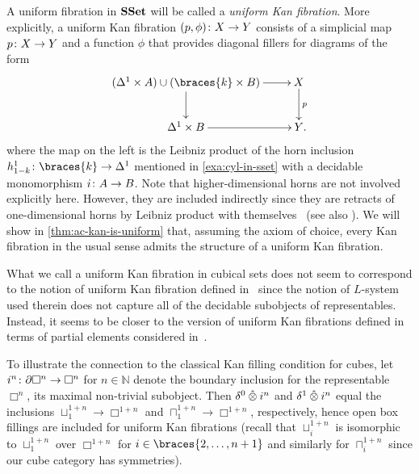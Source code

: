 \documentclass[reqno,10pt,a4paper,oneside,draft]{amsart}
\begin{document}
\begin{example}
A uniform fibration in $\mathbf{SSet}$ will be called a \emph{uniform Kan fibration}.
More explicitly, a uniform Kan fibration $(p, \phi) \colon X \to Y$ consists of a simplicial map $p \colon X \to Y$ and a function $\phi$ that provides diagonal fillers for diagrams of the form
\[
\xymatrix{
  (\Delta^1 \times A) \cup (\braces{k} \times B)
  \ar[r]
  \ar[d]
&
  X
  \ar[d]^{p}
\\
  \Delta^1 \times B
  \ar[r]
&
  Y
\rlap{.}}
\]
where the map on the  left  is  the Leibniz product of the horn inclusion $h_{1-k}^1 \co \braces{k} \to \Delta^1$ mentioned in \cref{exa:cyl-in-sset} with a decidable monomorphism $i \colon A \to B$.
Note that higher-dimensional horns are not involved explicitly here.
However, they are included indirectly since they are retracts of one-dimensional horns by Leibniz product with themselves~\cite{joyal-quaderns} (see also \cite[Proposition 2.1.2.6]{lurie:htt}).
We will show in \cref{thm:ac-kan-is-uniform} that, assuming the axiom of choice, every Kan fibration in the usual sense admits the structure of a uniform Kan fibration.
\end{example}

\begin{example}
What we call a uniform Kan fibration in cubical sets does not seem to correspond to the notion of uniform Kan fibration defined in~\cite{coquand-variation} since the notion of $L$-system used therein does not capture all of the decidable subobjects of representables.
Instead, it seems to be closer to the version of uniform Kan fibrations defined in terms of partial elements considered in~\cite{coquand-face,coquand-rules5}.

To illustrate the connection to the classical Kan filling condition for cubes, let $i^n \colon \partial \Box^n \to \Box^n$ for $n \in \mathbb{N}$ denote the boundary inclusion for the representable $\Box^n$, \ie its maximal non-trivial subobject.
Then $\delta^0 \mathbin{\hat{\otimes}} i^n$ and $\delta^1 \mathbin{\hat{\otimes}} i^n$ equal the inclusions $\sqcup_1^{1 + n} \to \Box^{1 + n}$ and $\sqcap_1^{1 + n} \to \Box^{1 + n}$, respectively, hence open box fillings are included for uniform Kan fibrations (recall that $\sqcup_i^{1+n}$ is isomorphic to $\sqcup_1^{1+n}$ over $\Box^{1+n}$ for $i \in \braces{2, \ldots, n + 1}$ and similarly for $\sqcap_i^{1+n}$ since our cube category has symmetries).
\end{example}
\end{document}
